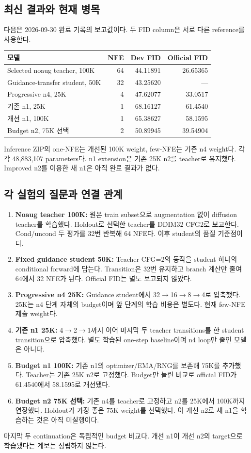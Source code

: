 \documentclass[11pt,a4paper]{article}
\begin{document}
\subsection{최신 결과와 현재 병목}
다음은 2026-09-30 완료 기록의 보고값이다. 두 FID column은 서로 다른 reference를 사용한다.
\par\noindent
\begin{tabularx}{\linewidth}{Yrrr}
\toprule 모델 & NFE & Dev FID & Official FID \\\midrule
Selected noaug teacher, 100K & 64 & 44.11891 & 26.65365 \\
Guidance-transfer student, 50K & 32 & 43.25620 & --- \\
Progressive n4, 25K & 4 & 47.62077 & 33.0517 \\
기존 n1, 25K & 1 & 68.16127 & 61.4540 \\
개선 n1, 100K & 1 & 65.38627 & 58.1595 \\
Budget n2, 75K 선택 & 2 & 50.89945 & 39.54904 \\
\bottomrule
\end{tabularx}
\par
Inference ZIP의 one-NFE는 개선된 100K weight, few-NFE는 기존 n4 weight다. 각각 48,883,107 parameters다. n1 extension은 기존 25K n2를 teacher로 유지했다. Improved n2를 이용한 새 n1은 아직 완료 결과가 없다.

\subsection{각 실험의 질문과 연결 관계}
\begin{enumerate}
\item \textbf{Noaug teacher 100K:} 원본 train subset으로 augmentation 없이 diffusion teacher를 학습했다. Holdout로 선택한 teacher를 DDIM32 CFG2로 보고한다. Cond/uncond 두 평가를 32번 반복해 64 NFE다. 이후 student의 품질 기준점이다.
\item \textbf{Fixed guidance student 50K:} Teacher CFG=2의 동작을 student 하나의 conditional forward에 담는다. Transition은 32번 유지하고 branch 계산만 줄여 64에서 32 NFE가 된다. Official FID는 별도 보고되지 않았다.
\item \textbf{Progressive n4 25K:} Guidance student에서 32$\to$16$\to$8$\to$4로 압축했다. 25K는 n4 단계 자체의 budget이며 앞 단계의 학습 비용은 별도다. 현재 few-NFE 제출 weight다.
\item \textbf{기존 n1 25K:} 4$\to$2$\to$1까지 이어 마지막 두 teacher transitions를 한 student transition으로 압축했다. 별도 학습된 one-step baseline이며 n4 loop만 줄인 모델은 아니다.
\item \textbf{Budget n1 100K:} 기존 n1의 optimizer/EMA/RNG를 보존해 75K를 추가했다. Teacher는 기존 25K n2로 고정했다. Budget만 늘린 비교로 official FID가 61.4540에서 58.1595로 개선됐다.
\item \textbf{Budget n2 75K 선택:} 기존 n4를 teacher로 고정하고 n2를 25K에서 100K까지 연장했다. Holdout가 가장 좋은 75K weight를 선택했다. 이 개선 n2로 새 n1을 학습하는 것은 아직 미실행이다.
\end{enumerate}
마지막 두 continuation은 독립적인 budget 비교다. 개선 n1이 개선 n2의 target으로 학습됐다는 계보는 성립하지 않는다.
\end{document}
